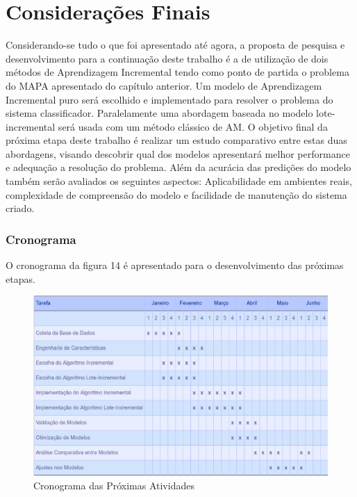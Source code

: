 \chapter{Considerações Finais}

Considerando-se tudo o que foi apresentado até agora, a proposta de pesquisa e desenvolvimento para a continuação deste trabalho é a de utilização de dois métodos de Aprendizagem Incremental tendo como ponto de partida o problema do MAPA apresentado do capítulo anterior. Um modelo de Aprendizagem Incremental puro será escolhido e implementado para resolver o problema do sistema classificador. Paralelamente uma abordagem baseada no modelo lote-incremental será usada com um método clássico de AM. O objetivo final da próxima etapa deste trabalho é realizar um estudo comparativo entre estas duas abordagens, visando descobrir qual dos modelos apresentará melhor performance e adequação a resolução do problema. Além da acurácia das predições do modelo também serão avaliados os seguintes aspectos: Aplicabilidade em ambientes reais, complexidade de compreensão do modelo e facilidade de manutenção do sistema criado.

\subsection{Cronograma}
O cronograma da figura 14 é apresentado para o desenvolvimento das próximas etapas. 

\begin{figure}[!h]
\centering
\includegraphics[keepaspectratio=true,scale=0.50]
{figuras/cronograma.eps}
\caption{Cronograma das Próximas Atividades}
\label{cronograma}
\end{figure}

